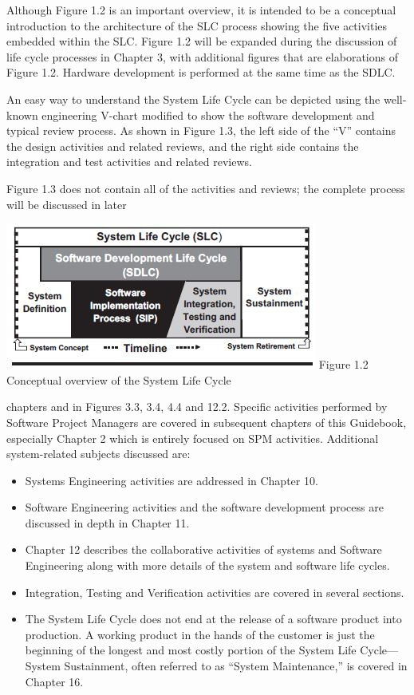 \documentclass{book}
\begin{document}
\begin{multicols}{2}
Although Figure 1.2 is an important overview, it is
intended to be a conceptual introduction to the architecture of the SLC process showing the five activities embedded within the SLC. Figure 1.2 will be expanded during
the discussion of life cycle processes in Chapter 3, with
additional figures that are elaborations of Figure 1.2.
Hardware development is performed at the same time as
the SDLC.

An easy way to understand the System Life Cycle can be
depicted using the well-known engineering V-chart modified to show the software development and typical review
process. As shown in Figure 1.3, the left side of the “V” contains the design activities and related reviews, and the right
side contains the integration and test activities and related
reviews.

Figure 1.3 does not contain all of the activities and
reviews; the complete process will be discussed in later 

\includegraphics{Figure1.2}
Figure 1.2 Conceptual overview of the System Life Cycle

chapters and in Figures
3.3, 3.4, 4.4 and 12.2. Specific activities performed by Software Project Managers are covered in
subsequent chapters of this Guidebook, especially Chapter
2 which is entirely focused on SPM activities. Additional
system-related subjects discussed are:

\begin{itemize}
\item Systems Engineering activities are addressed in Chapter 10.
\item Software Engineering activities and the software development process are discussed in depth in Chapter 11.
\item Chapter 12 describes the collaborative activities of
systems and Software Engineering along with more
details of the system and software life cycles.
\item Integration, Testing and Verification activities are covered in several sections.
\item The System Life Cycle does not end at the release of
a software product into production. A working product in the hands of the customer is just the beginning
of the longest and most costly portion of the System
Life Cycle—System Sustainment, often referred to as
“System Maintenance,” is covered in Chapter 16.
\end{itemize}


\end{multicols}
\end{document}

